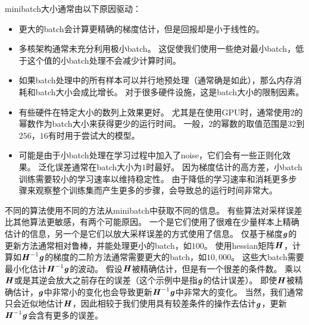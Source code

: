\gls{minibatch}大小通常由以下原因驱动：
\begin{itemize}
    \item 更大的\gls{batch}会计算更精确的梯度估计，但是回报却是小于线性的。
    
    \item 多核架构通常未充分利用极小\gls{batch}。
    这促使我们使用一些绝对最小\gls{batch}，低于这个值的小\gls{batch}处理不会减少计算时间。
    
    \item 如果\gls{batch}处理中的所有样本可以并行地预处理（通常确是如此），那么内存消耗和\gls{batch}大小会成比增长。
    对于很多硬件设施，这是\gls{batch}大小的限制因素。
    
    \item 有些硬件在特定大小的数列上效果更好。
    尤其是在使用GPU时，通常使用$2$的幂数作为\gls{batch}大小来获得更少的运行时间。
    一般，$2$的幂数的取值范围是$32$到$256$，$16$有时用于尝试大的模型。
    
    \item 
    可能是由于小\gls{batch}处理在学习过程中加入了\gls{noise}，它们会有一些正则化效果\citep{Wilson-2003}。
    泛化误差通常在\gls{batch}大小为$1$时最好。
    因为梯度估计的高方差，小\gls{batch}训练需要较小的学习速率以维持稳定性。
    由于降低的学习速率和消耗更多步骤来观察整个训练集而产生更多的步骤，会导致总的运行时间非常大。
\end{itemize}

不同的算法使用不同的方法从\gls{minibatch}中获取不同的信息。
有些算法对采样误差比其他算法更敏感，有两个可能原因。
一个是它们使用了很难在少量样本上精确估计的信息，另一个是它们以放大采样误差的方式使用了信息。
仅基于梯度$\boldsymbol{\mathit{g}}$的更新方法通常相对鲁棒，并能处理更小的\gls{batch}，如$100$。
使用\gls{hessian}矩阵$\boldsymbol{\mathit{H}}$，计算如$\boldsymbol{\mathit{H}}^{-1}\boldsymbol{\mathit{g}}$的梯度的二阶方法通常需要更大的\gls{batch}，如$10,000$。
这些大\gls{batch}需要最小化估计$\boldsymbol{\mathit{H}}^{-1}\boldsymbol{\mathit{g}}$的波动。
假设$\boldsymbol{\mathit{H}}$被精确估计，但是有一个很差的条件数。
乘以$\boldsymbol{\mathit{H}}$或是其逆会放大之前存在的误差（这个示例中是指$\boldsymbol{\mathit{g}}$的估计误差）。
即使$\boldsymbol{\mathit{H}}$被精确估计，$\boldsymbol{\mathit{g}}$中非常小的变化也会导致更新$\boldsymbol{\mathit{H}}^{-1}\boldsymbol{\mathit{g}}$中非常大的变化。
当然，我们通常只会近似地估计$\boldsymbol{\mathit{H}}$，因此相较于我们使用具有较差条件的操作去估计$\boldsymbol{\mathit{g}}$，更新$\boldsymbol{\mathit{H}}^{-1}\boldsymbol{\mathit{g}}$会含有更多的误差。


